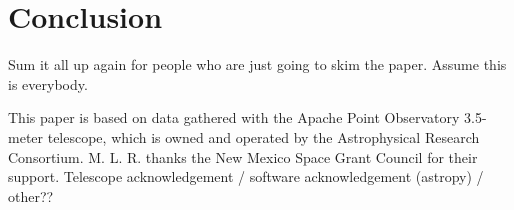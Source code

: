 \section{Conclusion}\label{conclude}
Sum it all up again for people who are just going to skim the paper. Assume this is everybody.

\acknowledgments
This paper is based on data gathered with the Apache Point Observatory 3.5-meter telescope, which is owned and operated by the Astrophysical Research Consortium.
M. L. R. thanks the New Mexico Space Grant Council for their support. Telescope acknowledgement / software acknowledgement (astropy) / other??